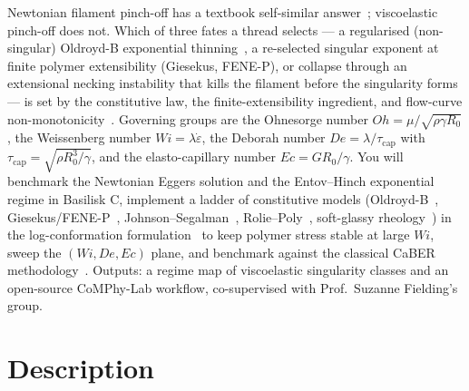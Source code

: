 \documentclass[11pt]{article}
\begin{document}
\begin{tcolorbox}[colback=mgray,colframe=mpurple,title=TL;DR]
Newtonian filament pinch-off has a textbook self-similar answer~\citep{eggers1993universalPinchOff,eggers2015singularities}; viscoelastic pinch-off does not. Which of three fates a thread selects --- a regularised (non-singular) Oldroyd-B exponential thinning~\citep{entovHinch1997}, a re-selected singular exponent at finite polymer extensibility (Giesekus, FENE-P), or collapse through an extensional necking instability that kills the filament before the singularity forms~\citep{fielding2011necking,hoyleFielding2016necking} --- is set by the constitutive law, the finite-extensibility ingredient, and flow-curve non-monotonicity~\citep{wilsonFielding2006}. Governing groups are the Ohnesorge number $Oh = \mu/\sqrt{\rho\gamma R_0}$, the Weissenberg number $Wi = \lambda\dot\varepsilon$, the Deborah number $De = \lambda/\tau_{\mathrm{cap}}$ with $\tau_{\mathrm{cap}} = \sqrt{\rho R_0^3/\gamma}$, and the elasto-capillary number $Ec = G R_0/\gamma$. You will benchmark the Newtonian Eggers solution and the Entov--Hinch exponential regime in Basilisk C, implement a ladder of constitutive models (Oldroyd-B~\citep{entovHinch1997}, Giesekus/FENE-P~\citep{bhat2010beads}, Johnson--Segalman~\citep{wilsonFielding2006}, Rolie--Poly~\citep{likhtmanGraham2003roliepoly}, soft-glassy rheology~\citep{sollich1997sgr}) in the log-conformation formulation~\citep{fattalKupferman2004logconf} to keep polymer stress stable at large $Wi$, sweep the $(Wi, De, Ec)$ plane, and benchmark against the classical CaBER methodology~\citep{mckinleyTripathi2000caber}. Outputs: a regime map of viscoelastic singularity classes and an open-source CoMPhy-Lab workflow, co-supervised with Prof.\ Suzanne Fielding's group.
\end{tcolorbox}

\section*{Description}
\end{document}
